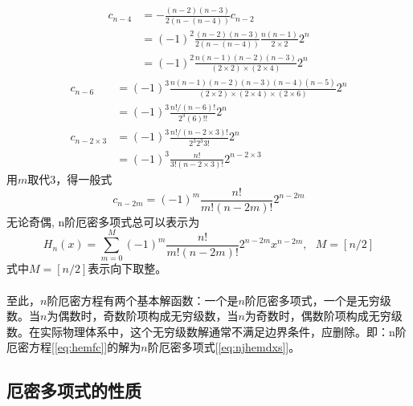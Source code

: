 	\begin{equation*}
		\begin{aligned}
			c_{n-4} &=-\frac{(n-2)(n-3) } { 2(n-(n-4))}  c_{n-2}  \\
			&=(-1)^2 \frac{(n-2)(n-3) } { 2(n-(n-4))}\frac{n(n-1) } { 2\times2}  2^n   \\
			&= (-1)^2 \frac{n(n-1)(n-2) (n-3) } { (2\times 2)\times (2\times 4)}  2^n
		\end{aligned}
	\end{equation*}
	\begin{equation*}
		\begin{aligned}
			c_{n-6} &= (-1)^3 \frac{n(n-1)(n-2) (n-3)(n-4) (n-5) } { (2\times 2)\times (2\times 4)\times (2\times 6)}  2^n \\
		&= (-1)^3 \frac{n!/(n-6)!} {2^3 (6)!!}  2^n \\
		c_{n-2\times 3} &= (-1)^3 \frac{n!/(n-2\times 3)!} {2^3 2^3 3!}  2^n \\
		&= (-1)^3 \frac{n!} { 3! (n-2\times 3)!}  2^{n-2\times 3}
		\end{aligned}
	\end{equation*} 
用$m$取代$3$，得一般式
	\begin{equation*}
 c_{n-2m} =(-1)^m \frac{n! } {  m ! (n-2m)!}  2^{n-2m} 
	\end{equation*}
	无论奇偶, n阶厄密多项式总可以表示为
	\begin{equation}\label{eq:njhemdxs}
		\boxed{H_n(x) =\sum_{m=0}^{M}  (-1)^m \frac{n! } {  m ! (n-2m)!}  2^{n-2m} x^{n-2m} ,  ~~~ M=[n/2] }
	\end{equation}   
	式中$M=[n/2]$表示向下取整。\\
~~\\
至此，$n$阶厄密方程有两个基本解函数：一个是$n$阶厄密多项式，一个是无穷级数。当$n$为偶数时，奇数阶项构成无穷级数，当$n$为奇数时，偶数阶项构成无穷级数。在实际物理体系中，这个无穷级数解通常不满足边界条件，应删除。即：n阶厄密方程[\ref{eq:hemfc}]的解为$n$阶厄密多项式[\ref{eq:njhemdxs}]。

\subsection{厄密多项式的性质}


